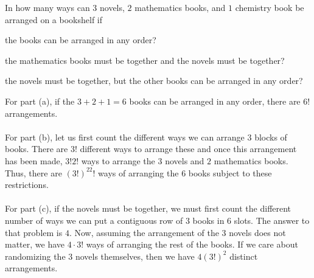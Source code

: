 \begin{problem}[Ross, \S 1, \# 11]
  In how many ways can \(3\) novels, \(2\) mathematics books, and \(1\)
  chemistry book be arranged on a bookshelf if
  \begin{alphlist}
  \item the books can be arranged in any order?
  \item the mathematics books must be together and the novels must be
    together?
  \item the novels must be together, but the other books can be arranged in
    any order?
  \end{alphlist}
\end{problem}
\begin{solution*}
  For part (a), if the \(3+2+1=6\) books can be arranged in any order,
  there are \(6!\) arrangements.
  \\\\
  For part (b), let us first count the different ways we can arrange \(3\)
  blocks of books. There are \(3!\) different ways to arrange these and
  once this arrangement has been made, \(3!2!\) ways to arrange the \(3\)
  novels and \(2\) mathematics books. Thus, there are \((3!)^22!\) ways of
  arranging the \(6\) books subject to these restrictions.
  \\\\
  For part (c), if the novels must be together, we must first count the
  different number of ways we can put a contiguous row of \(3\) books in
  \(6\) slots. The answer to that problem is \(4\). Now, assuming the
  arrangement of the \(3\) novels does not matter, we have \(4\cdot 3!\)
  ways of arranging the rest of the books. If we care about randomizing the
  \(3\) novels themselves, then we have \(4(3!)^2\) distinct arrangements.
\end{solution*}

